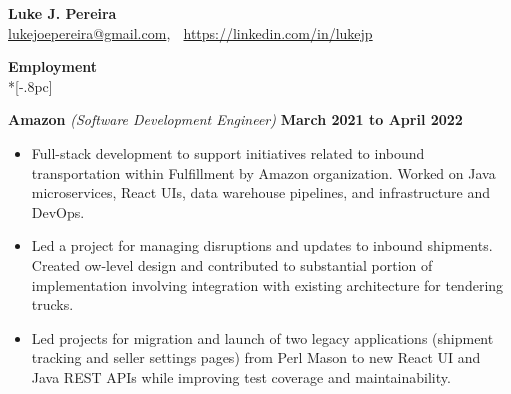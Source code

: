 \documentclass{article}
\begin{document}
\begin{center}
{\Large \bf Luke J. Pereira} \\[.5pc]
\href{mailto:lukejoepereira@gmail.com}{lukejoepereira@gmail.com}, $\;$
\href{https://linkedin.com/in/lukejp}{https://linkedin.com/in/lukejp}
\\[3pc]
\end{center}
\vspace{-25pt}

{\large \bf Employment} \\*[-.8pc]
\underline{\hspace{7in}}

{\bf Amazon } \textit{(Software Development Engineer)} \hfill {\bf March 2021 to April 2022\/} 
\begin{itemize}[leftmargin=*]
    \itemsep0em
    \renewcommand\labelitemi{\tiny$\bullet$}
    \item Full-stack development to support initiatives related to inbound transportation within Fulfillment by Amazon organization. Worked on Java microservices, React UIs, data warehouse pipelines, and infrastructure and DevOps.
    \item Led a project for managing disruptions and updates to inbound shipments. Created ow-level design and contributed to substantial portion of implementation involving integration with existing architecture for tendering trucks.
    \item Led projects for migration and launch of two legacy applications (shipment tracking and seller settings pages) from Perl Mason to new React UI and Java REST APIs while improving test coverage and maintainability.
\end{itemize}
\end{document}
